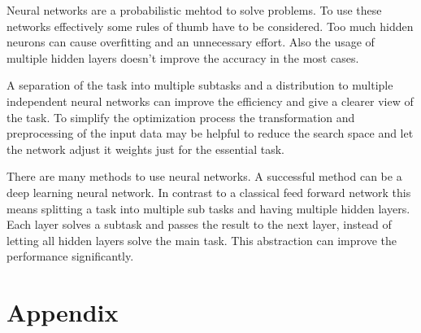 \documentclass[10pt,a4paper,DIV=11]{scrreprt}
\begin{document}
Neural networks are a probabilistic mehtod to solve problems. To use these networks effectively some rules of thumb have to be considered. Too much hidden neurons can cause overfitting and an unnecessary effort. Also the usage of multiple hidden layers doesn't improve the accuracy in the most cases.

A separation of the task into multiple subtasks and a distribution to multiple independent neural networks can improve the efficiency and give a clearer view of the task.
To simplify the optimization process the transformation and preprocessing of the input data may be helpful to reduce the search space and let the network adjust it weights just for the essential task.

There are many methods to use neural networks.
A successful method can be a deep learning neural network.\cite{deep}
In contrast to a classical feed forward network this means splitting a task into multiple sub tasks and having multiple hidden layers. Each layer solves a subtask and passes the result to the next layer, instead of letting all hidden layers solve the main task. This abstraction can improve the performance significantly.



\newpage


\listoffigures
\lstlistoflistings

\newpage











\newpage

\chapter*{Appendix}
\end{document}
